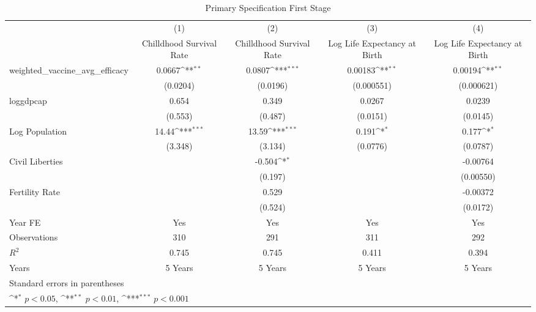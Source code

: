 \begin{table}[htbp]\centering
\def\sym#1{\ifmmode^{#1}\else\(^{#1}\)\fi}
\caption{Primary Specification First Stage}
\begin{tabular}{l*{4}{c}}
\toprule
                &\multicolumn{1}{c}{(1)}&\multicolumn{1}{c}{(2)}&\multicolumn{1}{c}{(3)}&\multicolumn{1}{c}{(4)}\\
                &\multicolumn{1}{c}{Chilldhood Survival Rate}&\multicolumn{1}{c}{Chilldhood Survival Rate}&\multicolumn{1}{c}{Log Life Expectancy at Birth}&\multicolumn{1}{c}{Log Life Expectancy at Birth}\\
\midrule
weighted\_vaccine\_avg\_efficacy&   0.0667\sym{**} &   0.0807\sym{***}&  0.00183\sym{**} &  0.00194\sym{**} \\
                & (0.0204)         & (0.0196)         &(0.000551)         &(0.000621)         \\
\addlinespace
loggdpcap       &    0.654         &    0.349         &   0.0267         &   0.0239         \\
                &  (0.553)         &  (0.487)         & (0.0151)         & (0.0145)         \\
\addlinespace
Log Population  &    14.44\sym{***}&    13.59\sym{***}&    0.191\sym{*}  &    0.177\sym{*}  \\
                &  (3.348)         &  (3.134)         & (0.0776)         & (0.0787)         \\
\addlinespace
Civil Liberties &                  &   -0.504\sym{*}  &                  & -0.00764         \\
                &                  &  (0.197)         &                  &(0.00550)         \\
\addlinespace
Fertility Rate  &                  &    0.529         &                  & -0.00372         \\
                &                  &  (0.524)         &                  & (0.0172)         \\
\addlinespace
Year FE         &      Yes         &      Yes         &      Yes         &      Yes         \\
\midrule
Observations    &      310         &      291         &      311         &      292         \\
\(R^{2}\)       &    0.745         &    0.745         &    0.411         &    0.394         \\
Years           &  5 Years         &  5 Years         &  5 Years         &  5 Years         \\
\bottomrule
\multicolumn{5}{l}{\footnotesize Standard errors in parentheses}\\
\multicolumn{5}{l}{\footnotesize \sym{*} \(p<0.05\), \sym{**} \(p<0.01\), \sym{***} \(p<0.001\)}\\
\end{tabular}
\end{table}
